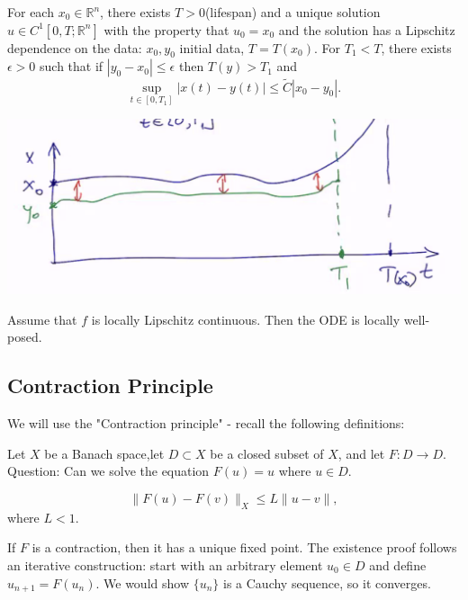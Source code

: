 \documentclass[12pt]{scrartcl}
\newcommand{\R}{\mathbb{R}}
\begin{document}
\begin{definition} For each $x_0 \in \R^n$, there exists $T > 0$(lifespan) and a unique solution $u \in C^1[0, T; \R^n]$ with the property that $u_0 = x_0$ and the solution has a Lipschitz dependence on the data: $x_0, y_0$ initial data, $T = T(x_0)$.  For $T_1 < T$, there exists $\epsilon > 0$ such that if $|y_0 - x_0| \le \epsilon$ then $T(y) > T_1$ and $$\sup_{t \in [0, T_1]} |x(t) - y(t)| \le \tilde{C}|x_0 - y_0|.$$
\end{definition}
\begin{center}
\includegraphics[scale=0.5]{localLipschitz.png}
\end{center}
\begin{thm} Assume that $f$ is locally Lipschitz continuous.  Then the ODE is locally well-posed.
\end{thm}

\subsection{Contraction Principle}
We will use the "Contraction principle" - recall the following definitions:
\begin{definition} Let $X$ be a Banach space,let $D \subset X$ be a closed subset of $X$, and let $F : D \rightarrow D$. Question: Can we solve the equation $F(u) = u$ where $u \in D$.
\end{definition}
\begin{definition}[Contraction] $$\|F(u) - F(v)\|_X \le L\|u - v\|,$$
where $L < 1$.
\end{definition}
If $F$ is a contraction, then it has a unique fixed point.  The existence proof follows an iterative construction: start with an arbitrary element $u_0 \in D$ and define $u_{n+1} = F(u_n)$.  We would show $\{u_n\}$ is a Cauchy sequence, so it converges.
\end{document}
